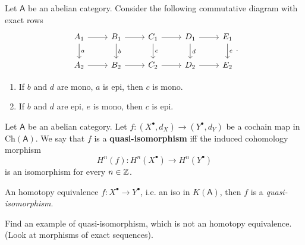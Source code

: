 \begin{lem}[$5$ lemma]
	Let $\mathsf{A}$ be an abelian category.
	Consider the following commutative diagram with exact rows
	\begin{equation}
	\begin{tikzcd}
		A_1 \arrow[r, "", rightarrow] \arrow[d, "a", rightarrow] &
		B_1 \arrow[r, "", rightarrow] \arrow[d, "b", rightarrow] &
		C_1 \arrow[r, "", rightarrow] \arrow[d, "c", rightarrow] &
		D_1 \arrow[r, "", rightarrow] \arrow[d, "d", rightarrow] &
		E_1 \arrow[d, "e", rightarrow] \\
		A_2 \arrow[r, "", rightarrow] &
		B_2 \arrow[r, "", rightarrow] &
		C_2 \arrow[r, "", rightarrow] &
		D_2 \arrow[r, "", rightarrow] &
		E_2 
	\end{tikzcd}
	.\end{equation} 
	\begin{enumerate}
		\item If $b$ and $d$ are mono, $a$ is epi, then $c$ is mono.
		\item If $b$ and $d$ are epi, $e$ is mono, then $c$ is epi.
	\end{enumerate}
\end{lem} 

\begin{defn}
	Let $\mathsf{A}$ be an abelian category.
	Let $f: \left( X^{\bullet}, d_{X} \right) \to \left( Y^{\bullet}, d_{Y} \right)$ be a cochain map in $\mathrm{Ch}(\mathsf{A})$.
	We say that $f$ is a \textbf{quasi-isomorphism} iff the induced cohomology morphism
	\begin{equation}
		H^n(f): H^n(X^\bullet) \to H^n(Y^\bullet)
	\end{equation} 
	is an isomorphism for every $n \in \mathbb{Z}$.
\end{defn}

\begin{lem}
	An homotopy equivalence $f: X^\bullet \to Y^\bullet$, i.e.
	an iso in $K(\mathsf{A})$, then $f$ is a \textit{quasi-isomorphism}.
\end{lem} 

\begin{lem}
	Find an example of quasi-isomorphism, which is not an homotopy equivalence.
	(Look at morphisms of exact sequences).
\end{lem} 

